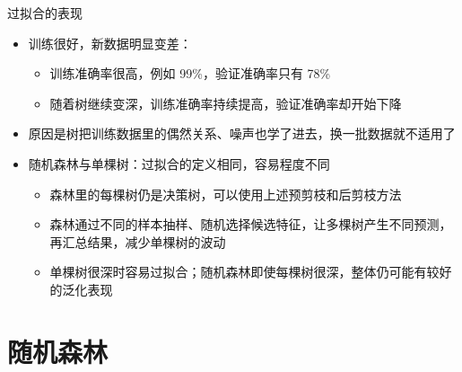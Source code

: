 \documentclass[10pt,aspectratio=43]{beamer}
\begin{document}
\begin{frame}{过拟合的表现}
  \begin{itemize}
    \item 训练很好，新数据明显变差：
      \begin{itemize}
        \item 训练准确率很高，例如 99\%，验证准确率只有 78\%
        \item 随着树继续变深，训练准确率持续提高，验证准确率却开始下降
      \end{itemize}
    \item 原因是树把训练数据里的偶然关系、噪声也学了进去，换一批数据就不适用了
  \end{itemize}
  \begin{itemize}
    \item 随机森林与单棵树：过拟合的定义相同，容易程度不同
      \begin{itemize}
        \item 森林里的每棵树仍是决策树，可以使用上述预剪枝和后剪枝方法
        \item 森林通过不同的样本抽样、随机选择候选特征，让多棵树产生不同预测，再汇总结果，减少单棵树的波动
        \item 单棵树很深时容易过拟合；随机森林即使每棵树很深，整体仍可能有较好的泛化表现
      \end{itemize}
  \end{itemize}
\end{frame}

\section{随机森林}
\end{document}

